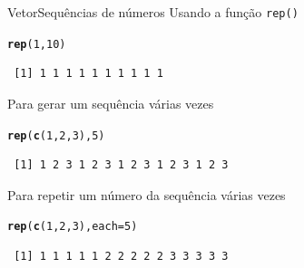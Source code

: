 \documentclass[10pt,handout]{beamer}\usepackage[]{graphicx}\usepackage[]{color}
\makeatletter
\newcommand{\hlnum}[1]{\textcolor[rgb]{0.686,0.059,0.569}{#1}}%
\newcommand{\hlstd}[1]{\textcolor[rgb]{0.345,0.345,0.345}{#1}}%
\newcommand{\hlkwc}[1]{\textcolor[rgb]{0.333,0.667,0.333}{#1}}%
\newcommand{\hlkwd}[1]{\textcolor[rgb]{0.282,0.239,0.545}{\textbf{#1}}}%
\newenvironment{kframe}{%
 \def\at@end@of@kframe{}%
 \ifinner\ifhmode%
  \def\at@end@of@kframe{\end{minipage}}%
  \begin{minipage}{\columnwidth}%
 \fi\fi%
 \def\FrameCommand##1{\hskip\@totalleftmargin \hskip-\fboxsep
 \colorbox{shadecolor}{##1}\hskip-\fboxsep
     \hskip-\linewidth \hskip-\@totalleftmargin \hskip\columnwidth}%
 \MakeFramed {\advance\hsize-\width
   \@totalleftmargin\z@ \linewidth\hsize
   \@setminipage}}%
 {\par\unskip\endMakeFramed%
 \at@end@of@kframe}
\newenvironment{knitrout}{}{} %
\makeatother
\begin{document}
\begin{frame}[fragile]{Vetor}{Sequências de números}
  Usando a função \verb|rep()|
\begin{knitrout}\small
{}\color{fgcolor}\begin{kframe}
\begin{alltt}
\hlkwd{rep}\hlstd{(}\hlnum{1}\hlstd{,} \hlnum{10}\hlstd{)}
\end{alltt}
\begin{verbatim}
 [1] 1 1 1 1 1 1 1 1 1 1
\end{verbatim}
\end{kframe}
\end{knitrout}

Para gerar um sequência várias vezes
\begin{knitrout}\small
{}\color{fgcolor}\begin{kframe}
\begin{alltt}
\hlkwd{rep}\hlstd{(}\hlkwd{c}\hlstd{(}\hlnum{1}\hlstd{,} \hlnum{2}\hlstd{,} \hlnum{3}\hlstd{),} \hlnum{5}\hlstd{)}
\end{alltt}
\begin{verbatim}
 [1] 1 2 3 1 2 3 1 2 3 1 2 3 1 2 3
\end{verbatim}
\end{kframe}
\end{knitrout}

Para repetir um número da sequência várias vezes
\begin{knitrout}\small
{}\color{fgcolor}\begin{kframe}
\begin{alltt}
\hlkwd{rep}\hlstd{(}\hlkwd{c}\hlstd{(}\hlnum{1}\hlstd{,} \hlnum{2}\hlstd{,} \hlnum{3}\hlstd{),} \hlkwc{each} \hlstd{=} \hlnum{5}\hlstd{)}
\end{alltt}
\begin{verbatim}
 [1] 1 1 1 1 1 2 2 2 2 2 3 3 3 3 3
\end{verbatim}
\end{kframe}
\end{knitrout}

\end{frame}
\end{document}
